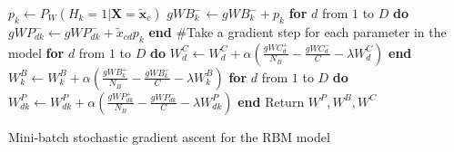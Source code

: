 \documentclass[11pt]{article}
\newcommand{\mbf}[1]{{\mathbf{#1}}}
\begin{document}
{\begin{algorithm}
\begin{algorithmic}[1]
        \STATE  $p_k \leftarrow P_W(H_k=1|\mbf{X}=\tilde{\mbf{x}}_c)$
        \STATE  $gWB_{k}^- \leftarrow gWB_{k}^- + p_k$
        \STATE  \textbf{for} $d$ from $1$ to $D$ \textbf{do}
            $gWP_{dk}^- \leftarrow gWP_{dk}^- + \tilde{x}_{cd}p_k$ \textbf{end}
      \ENDFOR
    \ENDFOR
      \STATE \#Take a gradient step for each parameter in the model
      \STATE   \textbf{for} $d$ from $1$ to $D$ \textbf{do}  $W^C_d \leftarrow W^C_d +  \alpha\left(\frac{gWC_{d}^+}{N_B} - 
               \frac{gWC_{d}^-}{C} -\lambda W^C_d\right)$ \textbf{end}
        \STATE  $W^B_k \leftarrow W^B_k +  \alpha\left(\frac{gWB_{k}^+}{N_B} - \frac{gWB_{k}^-}{C} -\lambda W^B_k\right)$
        \STATE   \textbf{for} $d$ from $1$ to $D$ \textbf{do}  $W^P_{dk} \leftarrow W^P_{dk} +  \alpha\left(\frac{gWP_{dk}^+}{N_B} - \frac{gWP_{dk}^-}{C} -\lambda W^P_{dk}\right)$ \textbf{end}
      \ENDFOR
  \ENDFOR
\ENDFOR
\STATE Return $W^P,W^B,W^C$
\end{algorithmic}
\caption{Mini-batch stochastic gradient ascent for the RBM model}
\label{learning}
\end{algorithm}
}
\end{document}

